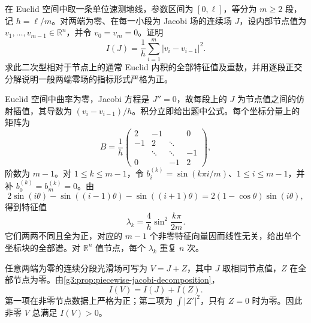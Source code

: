 \begin{exercise}\label{g3:ex:euclidean-discrete-index-matrix}
	在 Euclid 空间中取一条单位速测地线，参数区间为 \([0,\ell]\)，等分为 \(m\ge2\) 段，记 \(h=\ell/m\)。对两端为零、在每一小段为 Jacobi 场的连续场 \(J\)，设内部节点值为 \(v_1,\ldots,v_{m-1}\in\mathbb R^n\)，并令 \(v_0=v_m=0\)。证明
	\[
		I(J)=\frac1h\sum_{i=1}^m|v_i-v_{i-1}|^2.
	\]
	求此二次型相对于节点上的通常 Euclid 内积的全部特征值及重数，并用逐段正交分解说明一般两端零场的指标形式严格为正。
\end{exercise}
\begin{solution}
	Euclid 空间中曲率为零，Jacobi 方程是 \(J''=0\)，故每段上的 \(J\) 为节点值之间的仿射插值，其导数为 \((v_i-v_{i-1})/h\)。积分立即给出题中公式。每个坐标分量上的矩阵为
	\[
		B=\frac1h
		\begin{pmatrix}
			2&-1&&0\\
			-1&2&\ddots&\\
			&\ddots&\ddots&-1\\
			0&&-1&2
		\end{pmatrix},
	\]
	阶数为 \(m-1\)。对 \(1\le k\le m-1\)，令
	\(b_i^{(k)}=\sin(k\pi i/m)\)、\(1\le i\le m-1\)，并补 \(b_0^{(k)}=b_m^{(k)}=0\)。由
	\[
		2\sin(i\theta)-\sin((i-1)\theta)-\sin((i+1)\theta)
		=2(1-\cos\theta)\sin(i\theta),
	\]
	得到特征值
	\[
		\lambda_k=\frac4h\sin^2\frac{k\pi}{2m}.
	\]
	它们两两不同且全为正，对应的 \(m-1\) 个非零特征向量因而线性无关，给出单个坐标块的全部谱。对 \(\mathbb R^n\) 值节点，每个 \(\lambda_k\) 重复 \(n\) 次。

	任意两端为零的连续分段光滑场可写为 \(V=J+Z\)，其中 \(J\) 取相同节点值，\(Z\) 在全部节点为零。由\cref{g3:prop:piecewise-jacobi-decomposition}，
	\[
		I(V)=I(J)+I(Z).
	\]
	第一项在非零节点数据上严格为正；第二项为 \(\int|Z'|^2\)，只有 \(Z=0\) 时为零。因此非零 \(V\) 总满足 \(I(V)>0\)。
\end{solution}

